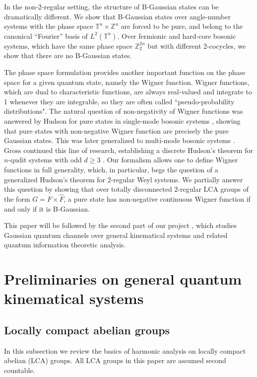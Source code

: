 \documentclass[12pt,reqno]{amsart}
\theoremstyle{definition}
\theoremstyle{definition}
\theoremstyle{definition}
\numberwithin{thm}{section}
\numberwithin{equation}{section}
\newcommand{\tor}{\mathbb{T}}
\newcommand{\z}{\mathbb{Z}}
\begin{document}
In the non-2-regular setting, the structure of B-Gaussian states can be dramatically different. We show that B-Gaussian states over angle-number systems with the phase space $\tor^n\times\z^n$ are forced to be pure, and belong to the canonical ``Fourier'' basis of $L^2(\tor^n)$. Over fermionic and hard-core bosonic systems, which have the same phase space $\z^{2n}_2$ but with different 2-cocycles, we show that there are no B-Gaussian states.

The phase space formulation provides another important function on the phase space for a given quantum state, namely the Wigner function. Wigner functions, which are dual to characteristic functions, are always real-valued and integrate to 1 whenever they are integrable, so they are often called ``pseudo-probability distributions". The natural question of non-negativity of Wigner functions was answered by Hudson for pure states in single-mode bosonic systems \cite{hudson1974wigner}, showing that pure states with non-negative Wigner function are precisely the pure Gaussian states. This was later generalized to multi-mode bosonic systems \cite{soto1983wigner}. Gross continued this line of research, establishing a discrete Hudson's theorem for $n$-qudit systems with odd $d\geq 3$ \cite{Gro}. Our formalism allows one to define Wigner functions in full generality, which, in particular, begs the question of a generalized Hudson's theorem for 2-regular Weyl systems. We partially answer this question by showing that over totally disconnected 2-regular LCA groups of the form $G=F\times\widehat{F}$, a pure state has non-negative continuous Wigner function if and only if it is B-Gaussian.

This paper will be followed by the second part of our project \cite{GQIT2}, which studies Gaussian quantum channels over general kinematical systems and related quantum information theoretic analysis.
 

\section{Preliminaries on general quantum kinematical systems}\label{sec-gen-Weyl}


\subsection{Locally compact abelian groups}

In this subsection we review the basics of harmonic analysis on locally compact abelian (LCA) groups. All LCA groups in this paper are assumed second countable.
\end{document}
